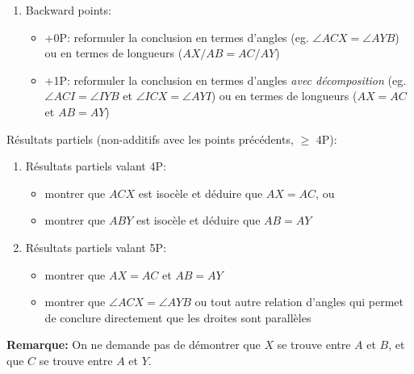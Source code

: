 {\begin{enumerate}
    \item Backward points:
\begin{itemize}
    \item +0P: reformuler la conclusion en termes d'angles (eg. $\angle ACX=\angle AYB$) ou en termes de longueurs ($AX/AB=AC/AY$)
    \item +1P: reformuler la conclusion en termes d'angles \textit{avec décomposition} (eg. $\angle ACI=\angle IYB$ et $\angle ICX=\angle AYI$) ou en termes de longueurs ($AX=AC$ et $AB=AY$)
\end{itemize}

\end{enumerate}

Résultats partiels (non-additifs avec les points précédents, $\geq$ 4P):
\begin{enumerate}
\item Résultats partiels valant 4P:
\begin{itemize}
    \item montrer que $ACX$ est isocèle et déduire que $AX=AC$, ou
    \item montrer que $ABY$ est isocèle et déduire que $AB=AY$
\end{itemize}

\item Résultats partiels valant 5P:
\begin{itemize}
    \item montrer que $AX=AC$ et $AB=AY$
    \item montrer que $\angle ACX=\angle AYB$ ou tout autre relation d'angles qui permet de conclure directement que les droites sont parallèles
\end{itemize}
\end{enumerate}

\textbf{Remarque:}
On ne demande pas de démontrer que $X$ se trouve entre $A$ et $B$, et que $C$ se trouve entre $A$ et $Y$.
}



\ita{}

